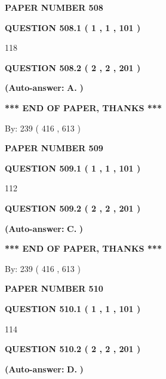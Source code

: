 \documentclass{ctexart}
\begin{document}
   
 {\textbf{ \Large{ PAPER NUMBER  508  }}}
   
   
   
   
  
  
{\textbf{\large{QUESTION
508.1 
 ( 1 , 1 , 101 )
}}}

118
  
  
{\textbf{\large{QUESTION
508.2 
 ( 2 , 2 , 201 )
}}}
 
 
{\textbf{(Auto-answer:}}
{\textbf{\large{
A.}}}
{\textbf{)}}
 
 
   
   
   
   
\vspace{1.0in} 
{\textbf{\large{ *** END OF PAPER, THANKS *** }}} 
   
   
\hspace{1.0in} By: 
 239 ( 416 ,  613 )
   
   
   
   
\newpage 
\setcounter{page}{ 
   509001 } 
   
   
 {\textbf{ \Large{ PAPER NUMBER  509  }}}
   
   
   
   
  
  
{\textbf{\large{QUESTION
509.1 
 ( 1 , 1 , 101 )
}}}

112
  
  
{\textbf{\large{QUESTION
509.2 
 ( 2 , 2 , 201 )
}}}
 
 
{\textbf{(Auto-answer:}}
{\textbf{\large{
C.}}}
{\textbf{)}}
 
 
   
   
   
   
\vspace{1.0in} 
{\textbf{\large{ *** END OF PAPER, THANKS *** }}} 
   
   
\hspace{1.0in} By: 
 239 ( 416 ,  613 )
   
   
   
   
\newpage 
\setcounter{page}{ 
   510001 } 
   
   
 {\textbf{ \Large{ PAPER NUMBER  510  }}}
   
   
   
   
  
  
{\textbf{\large{QUESTION
510.1 
 ( 1 , 1 , 101 )
}}}

114
  
  
{\textbf{\large{QUESTION
510.2 
 ( 2 , 2 , 201 )
}}}
 
 
{\textbf{(Auto-answer:}}
{\textbf{\large{
D.}}}
{\textbf{)}}
 
\end{document}
